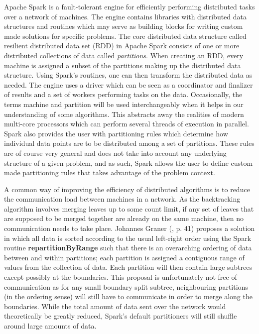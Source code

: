 \documentclass{report}
\begin{document}
Apache Spark \cite{spark sort} is a fault-tolerant engine for efficiently performing distributed tasks over a network of machines. The engine contains libraries with distributed data structures and routines which may serve as
building blocks for writing custom made solutions for specific problems. The core distributed data structure called resilient distributed data set (RDD) in Apache Spark consists of one or more distributed collections of data called \textit{partitions}. 
When creating an RDD, every machine is assigned a subset of the partitions making up the distributed
data structure. Using Spark's routines, one can then transform the distributed data as needed.
The engine uses a driver which can be seen as a coordinator and finalizer of results 
and a set of workers performing tasks on the data. 
Occasionally, the terms machine and partition will be used interchangeably when it helps in our understanding of some algorithms. This abstracts away the realities of modern multi-core processors
which can perform several threads of execution in parallel.
Spark also provides the user with partitioning rules which determine how individual data points are to be distributed among a set of
partitions. These rules are of course very general and does not take into account any underlying structure of a given problem, and as such, Spark allows the user to
define custom made partitioning rules that takes advantage of the problem context.

A common way of improving the efficiency of distributed algorithms is to reduce the communication 
load between machines in a network. As the backtracking algorithm involves merging
leaves up to some count limit, if any set of leaves that are supposed to be merged together are already on the same machine, then no communication needs to take place. Johannes Graner (\cite{Scalable Algorithms}, p. 41)
proposes a solution in which all data is sorted according to the usual left-right order using the Spark routine 
\textbf{repartitionByRange} such that there is an overarching ordering of data between and within partitions; each partition is assigned a contiguous range of values from the collection of data.
Each partition will then contain large subtrees except possibly at the boundaries.
This proposal is unfortunately not free of communication as for any small boundary split subtree, neighbouring partitions (in the ordering sense) will still have to communicate in order to merge along the boundaries. 
While the total amount of data sent over the network would theoretically be greatly reduced, Spark's default partitioners will still shuffle around large amounts of data. 
\end{document}
